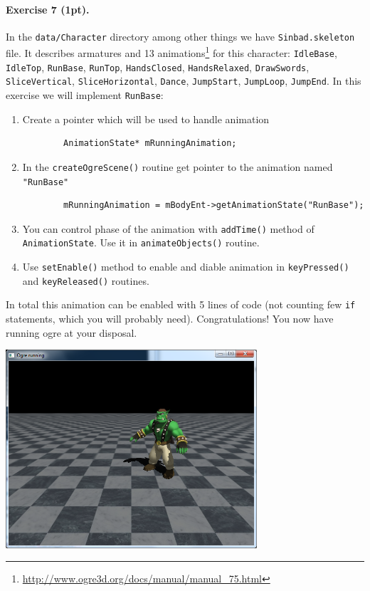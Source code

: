 \documentclass{article}
\newenvironment{exercise}[2]{\paragraph{Exercise #1 (#2pt).} }{
\medskip}
\begin{document}
\begin{exercise}{7}{1}
In the \verb#data/Character# directory among other things we have \verb#Sinbad.skeleton# file. It describes armatures and 13 animations\footnote{\url{http://www.ogre3d.org/docs/manual/manual_75.html}} for this character: \verb#IdleBase#, \verb#IdleTop#, \verb#RunBase#, \verb#RunTop#, \verb#HandsClosed#, \verb#HandsRelaxed#, \verb#DrawSwords#, \verb#SliceVertical#, \verb#SliceHorizontal#, \verb#Dance#, \verb#JumpStart#, \verb#JumpLoop#, \verb#JumpEnd#. In this exercise we will implement \verb#RunBase#:
\begin{enumerate}
	\item Create a pointer which will be used to handle animation
		\begin{verbatim}
		AnimationState* mRunningAnimation;
		\end{verbatim}
	\item In the \verb#createOgreScene()# routine get pointer to the animation named \verb#"RunBase"#
		\begin{verbatim}
		mRunningAnimation = mBodyEnt->getAnimationState("RunBase");
		\end{verbatim} 
	\item You can control phase of the animation with \verb#addTime()# method of \verb#AnimationState#. Use it in \verb#animateObjects()# routine.
	\item Use \verb#setEnable()# method to enable and diable animation in \verb#keyPressed()# and \verb#keyReleased()# routines.
\end{enumerate}
In total this animation can be enabled with 5 lines of code (not counting few \verb#if# statements, which you will probably need). Congratulations! You now have running ogre at your disposal.
\end{exercise}

\begin{center}
\includegraphics[width=0.7\textwidth]{meshanim.png}
\end{center}
\end{document}
